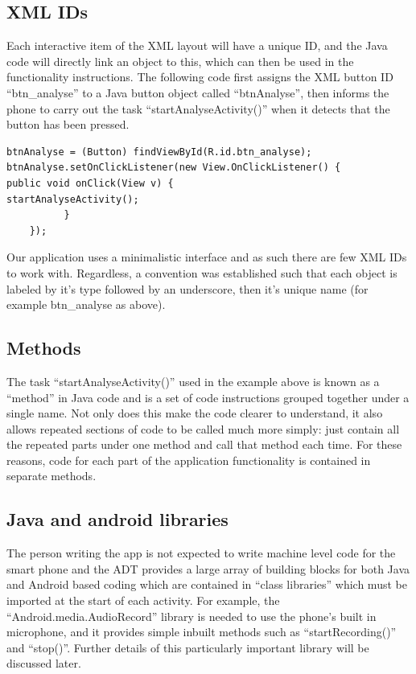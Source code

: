 \subsection{XML IDs}
Each interactive item of the XML layout will have a unique ID, and the Java code will directly link an object to this, which can then be used in the functionality instructions. The following code first assigns the XML button ID ``btn\_analyse'' to a Java button object called ``btnAnalyse'', then informs the phone to carry out the task ``startAnalyseActivity()'' when it detects that the button has been pressed.
\newpage
\begin{lstlisting}
btnAnalyse = (Button) findViewById(R.id.btn_analyse);
btnAnalyse.setOnClickListener(new View.OnClickListener() {
public void onClick(View v) {
startAnalyseActivity();
          }
    });
\end{lstlisting}
Our application uses a minimalistic interface and as such there are few XML IDs to work with. Regardless, a convention was established such that each object is labeled by it's type followed by an underscore, then it's unique name (for example btn\_analyse as above).
\subsection{Methods}
The task ``startAnalyseActivity()'' used in the example above is known as a ``method'' in Java code and is a set of code instructions grouped together under a single name. Not only does this make the code clearer to understand, it also allows repeated sections of code to be called much more simply: just contain all the repeated parts under one method and call that method each time. For these reasons, code for each part of the application functionality is contained in separate methods.
\subsection{Java and android libraries}
The person writing the app is not expected to write machine level code for the smart phone and the ADT provides a large array of building blocks for both Java and Android based coding which are contained in ``class libraries'' which must be imported at the start of each activity\cite[p.~126]{knudsen2011beg}. For example, the ``Android.media.AudioRecord'' library is needed to use the phone's built in microphone, and it provides simple inbuilt methods such as ``startRecording()'' and ``stop()''. Further details of this particularly important library will be discussed later.
